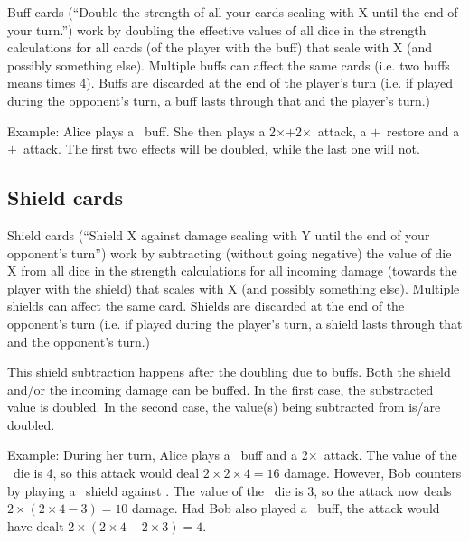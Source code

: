 \documentclass[dvipsnames,parskip,a4paper]{scrartcl}
\begin{document}
Buff cards (``Double the strength of all your cards scaling with X until the end of your turn.'') work by doubling the effective values of all dice in the strength calculations for all cards (of the player with the buff) that scale with X (and possibly something else). Multiple buffs can affect the same cards (i.e. two buffs means times 4). Buffs are discarded at the end of the player's turn (i.e. if played during the opponent's turn, a buff lasts through that and the player's turn.)

\vspace{4pt}

Example: Alice plays a \fire \ buff. She then plays a 2\hspace{1pt}$\times$\fire\hspace{1pt}$+$\hspace{1pt}2\hspace{1pt}$\times$\magic \ attack, a \nature\hspace{1pt}$+$\hspace{1pt}\fire \ restore and a \water\hspace{1pt}$+$\hspace{1pt}\earth \ attack. The first two effects will be doubled, while the last one will not.

\subsection*{Shield cards}

Shield cards (``Shield X against damage scaling with Y until the end of your opponent's turn'') work by subtracting (without going negative) the value of die X from all dice in the strength calculations for all incoming damage (towards the player with the shield) that scales with X (and possibly something else). Multiple shields can affect the same card. Shields are discarded at the end of the opponent's turn (i.e. if played during the player's turn, a shield lasts through that and the opponent's turn.)

\vspace{4pt}

This shield subtraction happens after the doubling due to buffs. Both the shield and/or the incoming damage can be buffed. In the first case, the substracted value is doubled. In the second case, the value(s) being subtracted from is/are doubled.

\vspace{4pt}

Example: During her turn, Alice plays a \fire \ buff and a 2\hspace{1pt}$\times$\hspace{1pt}\fire \ attack. The value of the \fire \ die is 4, so this attack would deal $2 \times 2 \times 4 = 16$ damage. However, Bob counters by playing a \water \ shield against \fire. The value of the \water \ die is 3, so the attack now deals $2 \times (2 \times 4 - 3) = 10$ damage. Had Bob also played a \water \ buff, the attack would have dealt $2 \times (2 \times 4 - 2 \times 3) = 4$.
\end{document}
